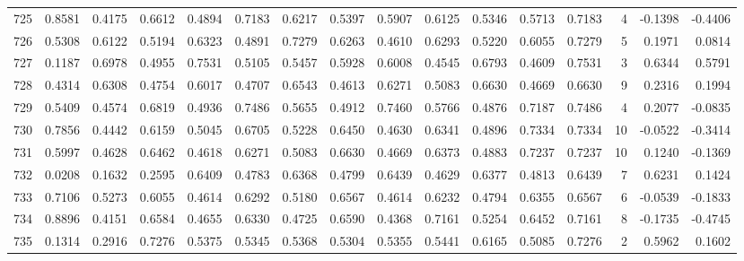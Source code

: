 \begin{tabular}{lrrrrrrrrrrrrrrr}
725 &      0.8581 &  0.4175 &  0.6612 &  0.4894 &  0.7183 &  0.6217 &  0.5397 &  0.5907 &  0.6125 &  0.5346 &   0.5713 &     0.7183 &      4 &                   -0.1398 &                    -0.4406 \\
726 &      0.5308 &  0.6122 &  0.5194 &  0.6323 &  0.4891 &  0.7279 &  0.6263 &  0.4610 &  0.6293 &  0.5220 &   0.6055 &     0.7279 &      5 &                    0.1971 &                     0.0814 \\
727 &      0.1187 &  0.6978 &  0.4955 &  0.7531 &  0.5105 &  0.5457 &  0.5928 &  0.6008 &  0.4545 &  0.6793 &   0.4609 &     0.7531 &      3 &                    0.6344 &                     0.5791 \\
728 &      0.4314 &  0.6308 &  0.4754 &  0.6017 &  0.4707 &  0.6543 &  0.4613 &  0.6271 &  0.5083 &  0.6630 &   0.4669 &     0.6630 &      9 &                    0.2316 &                     0.1994 \\
729 &      0.5409 &  0.4574 &  0.6819 &  0.4936 &  0.7486 &  0.5655 &  0.4912 &  0.7460 &  0.5766 &  0.4876 &   0.7187 &     0.7486 &      4 &                    0.2077 &                    -0.0835 \\
730 &      0.7856 &  0.4442 &  0.6159 &  0.5045 &  0.6705 &  0.5228 &  0.6450 &  0.4630 &  0.6341 &  0.4896 &   0.7334 &     0.7334 &     10 &                   -0.0522 &                    -0.3414 \\
731 &      0.5997 &  0.4628 &  0.6462 &  0.4618 &  0.6271 &  0.5083 &  0.6630 &  0.4669 &  0.6373 &  0.4883 &   0.7237 &     0.7237 &     10 &                    0.1240 &                    -0.1369 \\
732 &      0.0208 &  0.1632 &  0.2595 &  0.6409 &  0.4783 &  0.6368 &  0.4799 &  0.6439 &  0.4629 &  0.6377 &   0.4813 &     0.6439 &      7 &                    0.6231 &                     0.1424 \\
733 &      0.7106 &  0.5273 &  0.6055 &  0.4614 &  0.6292 &  0.5180 &  0.6567 &  0.4614 &  0.6232 &  0.4794 &   0.6355 &     0.6567 &      6 &                   -0.0539 &                    -0.1833 \\
734 &      0.8896 &  0.4151 &  0.6584 &  0.4655 &  0.6330 &  0.4725 &  0.6590 &  0.4368 &  0.7161 &  0.5254 &   0.6452 &     0.7161 &      8 &                   -0.1735 &                    -0.4745 \\
735 &      0.1314 &  0.2916 &  0.7276 &  0.5375 &  0.5345 &  0.5368 &  0.5304 &  0.5355 &  0.5441 &  0.6165 &   0.5085 &     0.7276 &      2 &                    0.5962 &                     0.1602 \\

\end{tabular}
